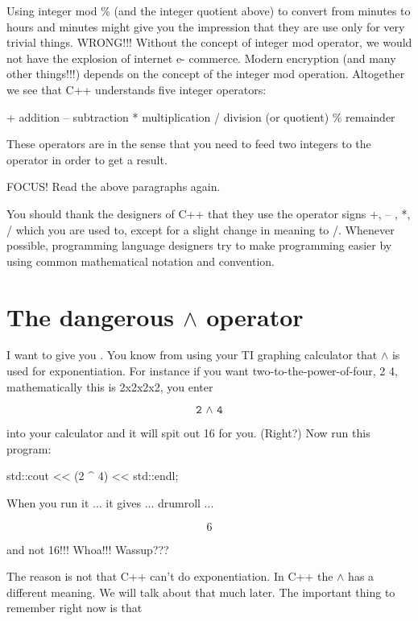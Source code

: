 Using integer mod \% (and the integer quotient above) to convert from
minutes to hours and minutes might give you the impression that they
are use only for very trivial things. WRONG!!! Without the concept of
integer mod operator, we would not have the explosion of internet e-
commerce. Modern encryption (and many other things!!!) depends on the
concept of the integer mod operation.
Altogether we see that C++ understands five integer operators:
\begin{center}
  +     addition
  –     subtraction
  *     multiplication
  /     division (or quotient)
  \%     remainder
\end{center}
These operators are 
in the sense that you need to feed two
integers to the operator in order to get a result.

FOCUS! Read the above paragraphs again.

%

You should thank the designers of C++ that they use the operator signs
+, – , *, / which you are used to, except for a slight change in meaning
to /. Whenever possible, programming language designers try to make
programming easier by using common mathematical notation and
convention.

\newpage\section{The dangerous $\land$ operator}

I want to give you .
You know from using your TI graphing calculator that $\land$ is used for
exponentiation. For instance if you want two-to-the-power-of-four, 2 4,
mathematically this is 2x2x2x2, you enter

\[
\texttt{2 $\land$ 4}
\]

into your calculator and it will spit out 16 for you. (Right?) Now run this
program:

\begin{console}
std::cout << (2 ^ 4) << std::endl;
\end{console}

When you run it ... it gives ... drumroll ...

\[6\]

and not 16!!! Whoa!!! Wassup???

The reason is not that C++ can't do exponentiation. In C++ the $\land$ has a
different meaning. We will talk about that much later. The important thing
to remember right now is that


